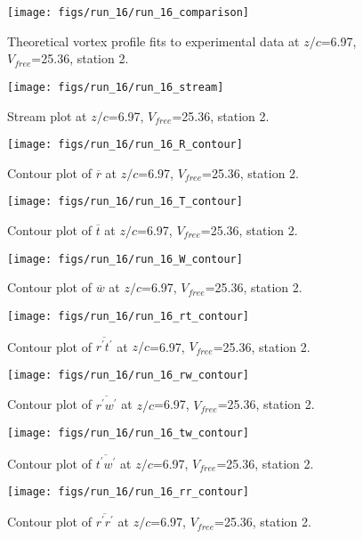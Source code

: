 \begin{figure}[H]
\centering
\texttt{[image: figs/run\_16/run\_16\_comparison]}
\caption{Theoretical vortex profile fits to experimental data at $z/c$=6.97, $V_{free}$=25.36, station 2.}
\end{figure}


\begin{figure}[H]
\centering
\texttt{[image: figs/run\_16/run\_16\_stream]}
\caption{Stream plot at $z/c$=6.97, $V_{free}$=25.36, station 2.}
\end{figure}


\begin{figure}[H]
\centering
\texttt{[image: figs/run\_16/run\_16\_R\_contour]}
\caption{Contour plot of $\overline{r}$ at $z/c$=6.97, $V_{free}$=25.36, station 2.}
\end{figure}


\begin{figure}[H]
\centering
\texttt{[image: figs/run\_16/run\_16\_T\_contour]}
\caption{Contour plot of $\overline{t}$ at $z/c$=6.97, $V_{free}$=25.36, station 2.}
\end{figure}


\begin{figure}[H]
\centering
\texttt{[image: figs/run\_16/run\_16\_W\_contour]}
\caption{Contour plot of $\overline{w}$ at $z/c$=6.97, $V_{free}$=25.36, station 2.}
\end{figure}


\begin{figure}[H]
\centering
\texttt{[image: figs/run\_16/run\_16\_rt\_contour]}
\caption{Contour plot of $\overline{r^\prime t^\prime}$ at $z/c$=6.97, $V_{free}$=25.36, station 2.}
\end{figure}


\begin{figure}[H]
\centering
\texttt{[image: figs/run\_16/run\_16\_rw\_contour]}
\caption{Contour plot of $\overline{r^\prime w^\prime}$ at $z/c$=6.97, $V_{free}$=25.36, station 2.}
\end{figure}


\begin{figure}[H]
\centering
\texttt{[image: figs/run\_16/run\_16\_tw\_contour]}
\caption{Contour plot of $\overline{t^\prime w^\prime}$ at $z/c$=6.97, $V_{free}$=25.36, station 2.}
\end{figure}


\begin{figure}[H]
\centering
\texttt{[image: figs/run\_16/run\_16\_rr\_contour]}
\caption{Contour plot of $\overline{r^\prime r^\prime}$ at $z/c$=6.97, $V_{free}$=25.36, station 2.}
\end{figure}


